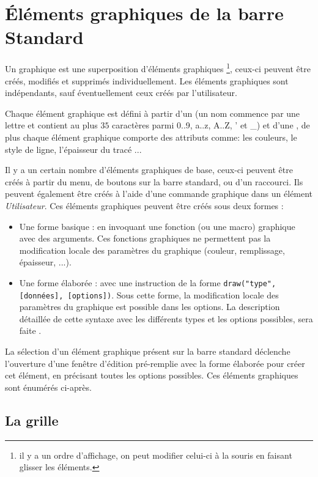 \chapter{Éléments graphiques de la barre Standard}\label{elemgraph}

Un graphique est une superposition d'éléments graphiques \footnote{il y a un ordre d'affichage, on peut modifier
celui-ci à la souris en faisant glisser les éléments.}, ceux-ci peuvent être créés, modifiés et supprimés
individuellement. Les éléments graphiques sont indépendants, sauf éventuellement ceux créés par l'utilisateur.

Chaque élément graphique est défini à partir d'un  (un nom commence par une lettre et contient au plus $35$ caractères parmi 0..9, a..z, A..Z, ' et \_)  et d'une , de plus chaque élément graphique comporte des attributs comme: les couleurs, le style de ligne, l'épaisseur du tracé ... 

Il y a un certain nombre d'éléments graphiques de base, ceux-ci peuvent être créés à partir du menu, de boutons sur la barre standard, ou d'un raccourci. Ils peuvent également être créés à l'aide d'une commande graphique dans un élément \textsl{Utilisateur}. Ces éléments graphiques peuvent être créés sous deux formes :
\begin{itemize}
\item Une forme basique : en invoquant une fonction (ou une macro) graphique avec des arguments. Ces fonctions graphiques ne permettent pas la modification locale des paramètres du graphique (couleur, remplissage, épaisseur, ...).
\item Une forme élaborée : avec une instruction de la forme \verb|draw("type", [données], [options])|. Sous cette forme, la modification locale des paramètres du graphique est possible dans les options. La description détaillée de cette syntaxe avec les différents types et les options possibles, sera faite .
\end{itemize}

La sélection d'un élément graphique présent sur la barre standard déclenche l'ouverture d'une fenêtre d'édition pré-remplie avec la forme élaborée pour créer cet élément, en précisant toutes les options possibles. Ces éléments graphiques sont énumérés ci-après.

\section{La grille}

